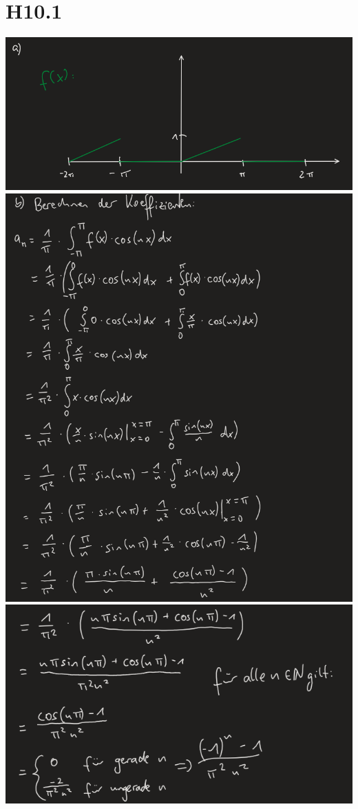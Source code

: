 \documentclass{article}
\begin{document}
\section*{H10.1} 
\includegraphics[scale=0.5]{ 1 } \\ 
\includegraphics[scale=0.5]{ 2 } \\ 
\includegraphics[scale=0.5]{ 3 } \\ 
\end{document}
